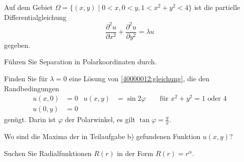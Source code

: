 Auf dem Gebiet $\Omega=\{(x,y)\;|\;0<x,0 < y, 1 < x^2+y^2< 4\}$
ist die partielle Differentialgleichung
\begin{equation}
\frac{\partial^2 u}{\partial x^2}+\frac{\partial^2u}{\partial y^2}=\lambda u
\label{40000012:gleichung}
\end{equation}
gegeben.
\begin{teilaufgaben}
\item
Führen Sie Separation in Polarkoordinaten durch.
\item
Finden Sie für $\lambda=0$ eine Lösung von
\eqref{40000012:gleichung}, die den Randbedingungen
\begin{align*}
u(x,0)&= 0&u(x,y)&=\sin 2\varphi \qquad \text{für $x^2+y^2=1$ oder $4$}\\
u(0,y)&= 0&      &
\end{align*}
genügt.
Darin ist $\varphi$ der Polarwinkel, es gilt $\tan\varphi=\frac{y}{x}$.
\item
Wo sind die Maxima der in Teilaufgabe b) gefundenen Funktion $u(x,y)$?
\end{teilaufgaben}

\begin{hinweis}
Suchen Sie Radialfunktionen $R(r)$ in der Form $R(r)=r^{\alpha}$.
\end{hinweis}

